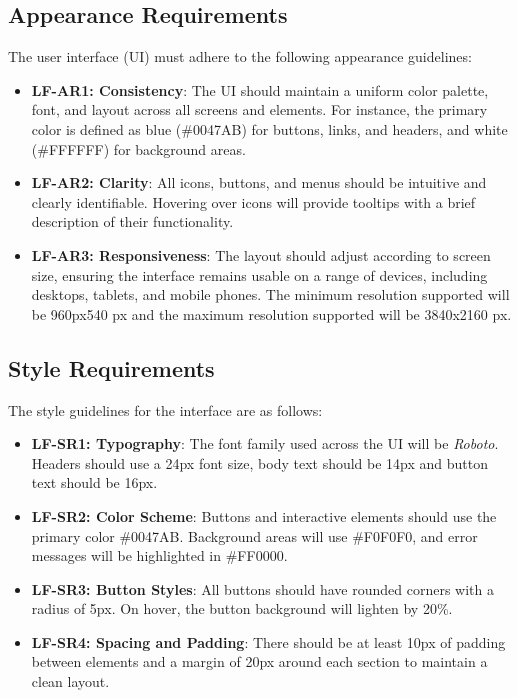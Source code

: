 \documentclass[12pt]{article}
\begin{document}
\subsection{Appearance Requirements}
The user interface (UI) must adhere to the following appearance guidelines:
\begin{itemize}
    \item \textbf{LF-AR1: Consistency}: The UI should maintain a uniform color palette, 
    font, and layout across all screens and elements. For instance, the primary 
    color is defined as blue (\#0047AB) for buttons, links, and headers, and 
    white (\#FFFFFF) for background areas.
    
    \item \textbf{LF-AR2: Clarity}: All icons, buttons, and menus should be intuitive and 
    clearly identifiable. Hovering over icons will provide tooltips with a brief 
    description of their functionality.
    
    \item \textbf{LF-AR3: Responsiveness}: The layout should adjust according to screen 
    size, ensuring the interface remains usable on a range of devices, including 
    desktops, tablets, and mobile phones. The minimum resolution supported will be
    960px540 px and the maximum resolution supported will be 3840x2160 px.
\end{itemize}

\subsection{Style Requirements}
The style guidelines for the interface are as follows:
\begin{itemize}
    \item \textbf{LF-SR1: Typography}: The font family used across the UI will be 
    \textit{Roboto}. Headers should use a 24px font size, body text should be 
    14px and button text should be 16px.
    
    \item \textbf{LF-SR2: Color Scheme}: Buttons and interactive elements should use the 
    primary color \#0047AB. Background areas will use \#F0F0F0, and error 
    messages will be highlighted in \#FF0000.
    
    \item \textbf{LF-SR3: Button Styles}: All buttons should have rounded corners with 
    a radius of 5px. On hover, the button background will lighten by 20\%.
    
    \item \textbf{LF-SR4: Spacing and Padding}: There should be at least 10px of padding 
    between elements and a margin of 20px around each section to maintain a clean 
    layout.
\end{itemize}
\end{document}
